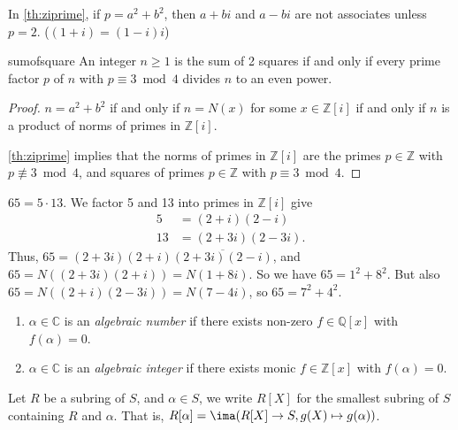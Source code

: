 \begin{remark}
    In \cref{th:ziprime}, if \(p = a^2 + b^2\), then \(a + bi\) and \(a - bi\) are not associates unless \(p = 2\). (\((1 + i) = (1-i)i\))
\end{remark}
\begin{corollary}{}{sumofsquare}
    An integer \(n \geq 1\) is the sum of 2 squares if and only if every prime factor \(p\) of \(n\) with \(p \equiv 3 \bmod 4\) divides \(n\) to an even power.
\end{corollary}
\begin{proof}
    \(n = a^2 + b^2\) if and only if \(n = N(x)\) for some \(x \in \mathbb{Z}[i]\) if and only if \(n\) is a product of norms of primes in \(\mathbb{Z}[i]\).

    \cref{th:ziprime} implies that the norms of primes in \(\mathbb{Z}[i]\) are the primes \(p \in \mathbb{Z}\) with \(p \not \equiv 3 \bmod 4\), and squares of primes \(p \in \mathbb{Z}\) with \(p \equiv 3 \bmod 4\).
\end{proof}
\begin{example}
    \(65 = 5 \cdot 13\). We factor 5 and 13 into primes in \(\mathbb{Z}[i]\) give
    \begin{align*}
        5 &= (2 + i)(2-i)\\
        13 &= (2 + 3i)(2-3i).
    \end{align*}
    Thus, \(65 = (2 + 3i)(2 + i)\overline{(2 + 3i)(2 - i)}\), and \(65 = N((2 + 3i)(2 + i)) = N(1 + 8i)\). So we have \(65 = 1^2 + 8^2\).  But also \(65 = N((2 + i)(2 - 3i)) = N(7 - 4i)\), so \(65 = 7^2 + 4^2\).
\end{example}
\begin{definition}{}{}
    \begin{enumerate}
        \item \(\alpha \in \mathbb{C}\) is an \textit{algebraic number} if there exists non-zero \(f \in \mathbb{Q}[x]\) with \(f(\alpha) = 0\).
        \item \(\alpha \in \mathbb{C}\) is an \textit{algebraic integer} if there exists monic \(f \in \mathbb{Z}[x]\) with \(f(\alpha) = 0\).
    \end{enumerate}
\end{definition}
\begin{notation}
    Let \(R\) be a subring of \(S\), and \(\alpha \in S\), we write \(R[X]\) for the smallest subring of \(S\) containing \(R\) and \(\alpha\). That is, \(R[\alpha] = \ima(R[X] \to S, g(X) \mapsto g(\alpha))\).
\end{notation}
